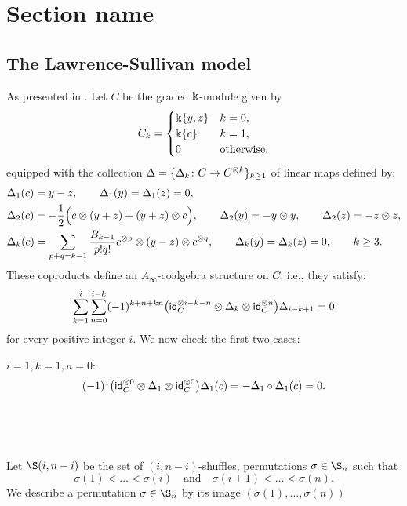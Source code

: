 
\newpage

\section{Section name}

\subsection{The Lawrence-Sullivan model}

As presented in \cite[p.77]{buijs2013algebraicmodels}.
Let $C$ be the graded $\Bbbk$-module given by
\[
C_k = \begin{cases}
\Bbbk\{y,z\} & k=0, \\
\Bbbk\{c\} & k=1, \\
0 & \text{otherwise},
\end{cases}
\]
equipped with the collection $\Delta = \{\Delta_k \colon C \to C^{\otimes k}\}_{k \geq 1}$ of linear maps defined by:
\begin{align*}
& \Delta_1(c) = y-z, \qquad
\Delta_1(y) = \Delta_1(z) = 0, \\
& \Delta_2(c) = -\frac{1}{2} \Big( c \otimes (y+z) + (y+z) \otimes c \Big), \qquad
\Delta_2(y) = -y \otimes y, \qquad
\Delta_2(z) = -z \otimes z, \\
& \Delta_k(c) = \sum_{p+q=k-1} \frac{B_{k-1}}{p!q!} c^{\otimes p} \otimes (y-z) \otimes c^{\otimes q}, \qquad
\Delta_k(y) = \Delta_k(z) = 0, \qquad k \geq 3.
\end{align*}
These coproducts define an $A_\infty$-coalgebra structure on $C$, i.e., they satisfy:
\[
\sum_{k=1}^i \sum_{n=0}^{i-k} (-1)^{k+n+kn} \big( \mathsf{id}_C^{\otimes i-k-n} \otimes \Delta_k \otimes \mathsf{id}_C^{\otimes n} \big) \Delta_{i-k+1} = 0
\]
for every positive integer $i$.
We now check the first two cases:

\fullline

\noindent $i=1, k=1, n=0$:
\[
(-1)^1 \big( \mathsf{id}_C^{\otimes 0} \otimes \Delta_1 \otimes \mathsf{id}_C^{\otimes 0} \big) \Delta_{1}(c) =
- \Delta_1 \circ \Delta_1(c) = 0.
\]

\fullline



\fullline \ \par



\fullline \ \ \par

Let $\S(i,n-i)$ be the set of $(i,n-i)$-shuffles, permutations $\sigma \in \S_n$ such that
\[
\sigma(1) < \dots < \sigma(i) \quad \text{and} \quad
\sigma(i+1) < \dots < \sigma(n).
\]
We describe a permutation $\sigma \in \S_n$ by its image $(\sigma(1), \dots, \sigma(n))$

